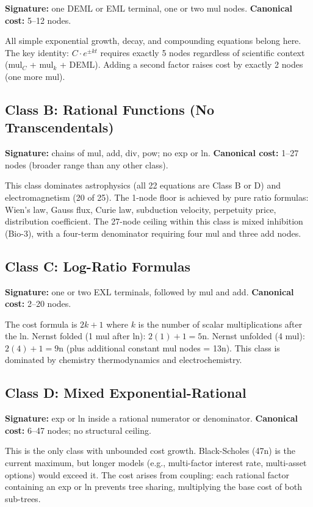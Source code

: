 \documentclass[12pt,a4paper]{article}
\theoremstyle{definition}
\begin{document}
\textbf{Signature:} one DEML or EML terminal, one or two mul nodes.
\textbf{Canonical cost:} 5--12 nodes.

All simple exponential growth, decay, and compounding equations belong here.
The key identity: $C \cdot e^{\pm kt}$ requires exactly 5 nodes regardless
of scientific context (mul$_{C}$ + mul$_{k}$ + DEML).
Adding a second factor raises cost by exactly 2 nodes (one more mul).

\subsection{Class B: Rational Functions (No Transcendentals)}

\textbf{Signature:} chains of mul, add, div, pow; no exp or ln.
\textbf{Canonical cost:} 1--27 nodes (broader range than any other class).

This class dominates astrophysics (all 22 equations are Class B or D) and
electromagnetism (20 of 25).  The 1-node floor is achieved by pure
ratio formulas: Wien's law, Gauss flux, Curie law, subduction velocity,
perpetuity price, distribution coefficient.
The 27-node ceiling within this class is mixed inhibition (Bio-3), with
a four-term denominator requiring four mul and three add nodes.

\subsection{Class C: Log-Ratio Formulas}

\textbf{Signature:} one or two EXL terminals, followed by mul and add.
\textbf{Canonical cost:} 2--20 nodes.

The cost formula is $2k + 1$ where $k$ is the number of scalar multiplications
after the ln.  Nernst folded (1 mul after ln): $2(1)+1 = 5$n.
Nernst unfolded (4 mul): $2(4)+1 = 9$n (plus additional constant mul nodes = 13n).
This class is dominated by chemistry thermodynamics and electrochemistry.

\subsection{Class D: Mixed Exponential-Rational}

\textbf{Signature:} exp or ln inside a rational numerator or denominator.
\textbf{Canonical cost:} 6--47 nodes; no structural ceiling.

This is the only class with unbounded cost growth.  Black-Scholes (47n)
is the current maximum, but longer models (e.g., multi-factor interest rate,
multi-asset options) would exceed it.
The cost arises from coupling: each rational factor containing an exp or ln
prevents tree sharing, multiplying the base cost of both sub-trees.
\end{document}
